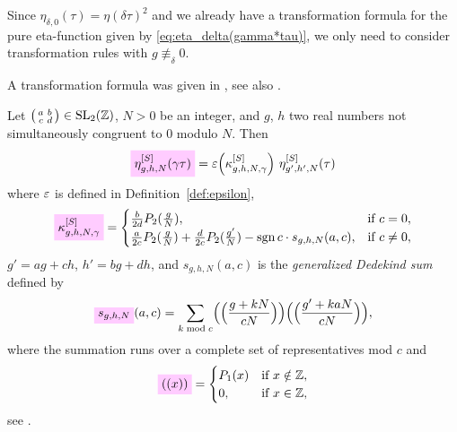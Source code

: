 \documentclass{article}
\begin{document}
Since $\eta_{\delta,0}(\tau) = \eta(\delta\tau)^2$ and we already have
a transformation formula for the pure eta-function given by
\eqref{eq:eta_delta(gamma*tau)}, we only need to consider
transformation rules with $g \not\equiv_\delta 0$.

A transformation formula was given in
\cite[Chp.~VIII]{Schoeneberg_EllipticModularFunctions_1974}, see
also \cite[p.~673]{Yang_GeneralizedDedekindEtaFunctions_2004}.

\begin{Lemma}
  \label{thm:Generalized-Eta-Transformation-Schoeneberg}
  Let
  $\left(\begin{smallmatrix}a&b\\c&d\end{smallmatrix}\right) \in
  \SL2Z$, $N>0$ be an integer, and $g$, $h$ two real numbers not
  simultaneously congruent to 0 modulo $N$.
  Then
  \begin{gather}
    \label{eq:eta_g-h-N^[S](gamma*tau)}
    \defineNotation[eta-g-h-N-gamma-tau-Schoeneberg]%
      {\eta_{g,h,N}^{[S]}(\gamma\tau)}
    =
    \unityPower{\kappa_{g,h,N,\gamma}^{[S]}} \, \eta_{g',h',N}^{[S]}(\tau)
  \end{gather}
  where $\varepsilon$ is defined in Definition~\ref{def:epsilon},
  \begin{gather}
    \defineNotation[kappa-g-h-N-gamma-Schoeneberg]{\kappa_{g,h,N,\gamma}^{[S]}}
    =
    \begin{cases}
      \frac{b}{2d} P_2(\frac{g}{N}), &\text{if $c=0$},
      \\
      \frac{a}{2c} P_2(\frac{g}{N})
        + \frac{d}{2c} P_2(\frac{g'}{N})
        - \sign c \cdot s_{g,h,N}(a,c),
      &
      \text{if $c\not=0$},
    \end{cases}
    \label{eq:kappa_g-h-N-gamma-Schoeneberg}
  \end{gather}
  $g'=ag+ch$, $h'=bg+dh$, and $s_{g,h,N}(a,c)$ is the
  \emph{generalized Dedekind sum} defined by
  \begin{gather}
    \defineNotation[s-g-h-N]{s_{g,h,N}}(a,c)
    =
    \sum_{k \bmod c}
    \Bigl(\Bigl( \frac{g + k N}{c N} \Bigr)\Bigr)
    \Bigl(\Bigl( \frac{g' + k a N}{c N} \Bigr)\Bigr),
    \label{eq:s_g-h-N}
  \end{gather}
  where the summation runs over a complete set of representatives mod
  $c$ and
  \begin{gather*}
    \defineNotation[x-P1-0]{((x))}
    =
    \begin{cases}
      P_1(x) & \text{if $x\notin\setZ$},
      \\
      0, & \text{if $x \in \setZ$},
    \end{cases}
  \end{gather*}
  see \cite[p.~673]{Yang_GeneralizedDedekindEtaFunctions_2004}.
\end{Lemma}
\end{document}
